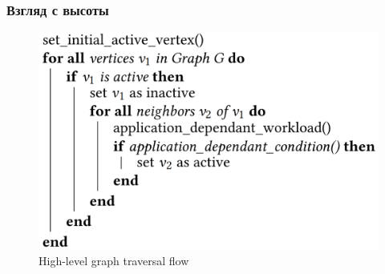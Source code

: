 \documentclass[xcolor=table,english]{beamer}
\begin{document}
\begin{frame}[fragile] \frametitle{Взгляд с высоты}
    \begin{center}
    \begin{minipage}[m]{0.8\linewidth}
        \begin{figure}
            \centering
            \includegraphics[width=\textwidth]{figures/high_level_algo.png}
            \caption{High-level graph traversal flow}
            \label{fig:high_level_algo}
        \end{figure}
    \end{minipage}\hfill
    \end{center}
\end{frame}
\end{document}
